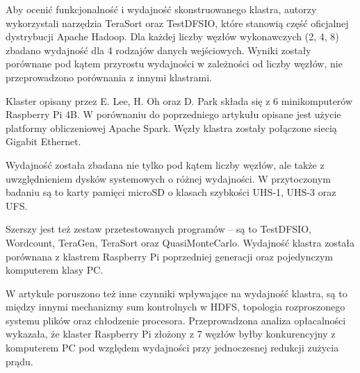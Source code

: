 Aby ocenić funkcjonalność i wydajność skonstruowanego klastra, autorzy wykorzystali narzędzia
TeraSort oraz TestDFSIO, które stanowią część oficjalnej dystrybucji Apache Hadoop.
Dla każdej liczby węzłów wykonawczych (2, 4, 8) zbadano wydajność dla 4 rodzajów danych
wejściowych. Wyniki zostały porównane pod kątem przyrostu wydajności w zależności
od liczby węzłów, nie przeprowadzono porównania z innymi klastrami.

Klaster opisany przez E. Lee, H. Oh oraz D. Park \cite{rpi-cluster-2} składa się z 6
minikomputerów Raspberry Pi 4B. W porównaniu do poprzedniego artykułu opisane jest
użycie platformy obliczeniowej Apache Spark. Węzły klastra zostały połączone siecią
Gigabit Ethernet.

Wydajność została zbadana nie tylko pod kątem liczby węzłów, ale także z uwzględnieniem
dysków systemowych o różnej wydajności. W przytoczonym badaniu są to karty pamięci
microSD o klasach szybkości UHS-1, UHS-3 oraz UFS.

Szerszy jest też zestaw przetestowanych programów -- są to TestDFSIO, Wordcount, TeraGen,
TeraSort oraz QuasiMonteCarlo. Wydajność klastra została porównana z klastrem Raspberry Pi
poprzedniej generacji oraz pojedynczym komputerem klasy PC.

W artykule poruszono też inne czynniki wpływające na wydajność klastra, są to między innymi
mechanizmy sum kontrolnych w HDFS, topologia rozproszonego systemu plików oraz chłodzenie
procesora. Przeprowadzona analiza opłacalności wykazała, że klaster Raspberry Pi złożony
z 7 węzłów byłby konkurencyjny z komputerem PC pod względem wydajności przy jednoczesnej
redukcji zużycia prądu.
